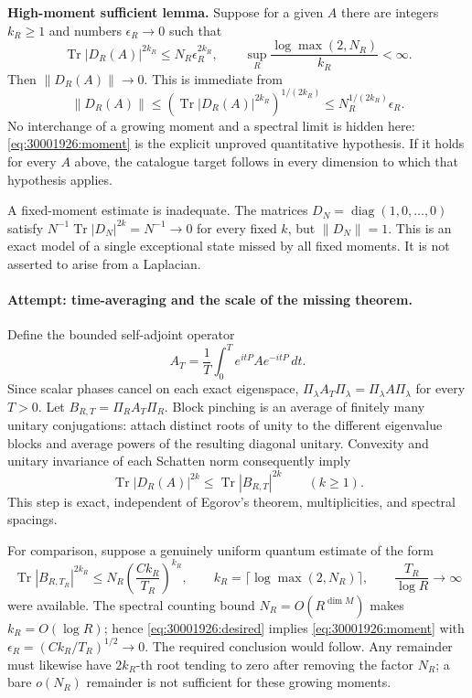 \documentclass[11pt,a4paper]{article}
\numberwithin{equation}{section}
\begin{document}
\textbf{High-moment sufficient lemma.}
Suppose for a given $A$ there are integers $k_R\geq1$ and numbers
$\epsilon_R\to0$ such that
\begin{equation}\label{eq:30001926:moment}
 \operatorname{Tr}|D_R(A)|^{2k_R}\leq N_R\epsilon_R^{2k_R},
 \qquad \sup_R\frac{\log\max(2,N_R)}{k_R}<\infty.
\end{equation}
Then $\|D_R(A)\|\to0$. This is immediate from
\[
 \|D_R(A)\|\leq
 (\operatorname{Tr}|D_R(A)|^{2k_R})^{1/(2k_R)}
 \leq N_R^{1/(2k_R)}\epsilon_R.
\]
No interchange of a growing moment and a spectral limit is hidden here:
\eqref{eq:30001926:moment} is the explicit unproved quantitative hypothesis.
If it holds for every $A$ above, the catalogue target follows in every
dimension to which that hypothesis applies.

A fixed-moment estimate is inadequate. The matrices
$D_N=\operatorname{diag}(1,0,\ldots,0)$ satisfy
$N^{-1}\operatorname{Tr}|D_N|^{2k}=N^{-1}\to0$ for every fixed $k$, but
$\|D_N\|=1$. This is an exact model of a single exceptional state missed
by all fixed moments. It is not asserted to arise from a Laplacian.

\paragraph{Attempt: time-averaging and the scale of the missing theorem.}
Define the bounded self-adjoint operator
\[
 A_T=\frac1T\int_0^T e^{itP}Ae^{-itP}\,dt.
\]
Since scalar phases cancel on each exact eigenspace,
$\Pi_\lambda A_T\Pi_\lambda=\Pi_\lambda A\Pi_\lambda$ for every $T>0$.
Let $B_{R,T}=\Pi_R A_T\Pi_R$. Block pinching is an average of finitely
many unitary conjugations: attach distinct roots of unity to the different
eigenvalue blocks and average powers of the resulting diagonal unitary.
Convexity and unitary invariance of each Schatten norm consequently imply
\begin{equation}\label{eq:30001926:pinching}
 \operatorname{Tr}|D_R(A)|^{2k}
 \leq\operatorname{Tr}|B_{R,T}|^{2k}\qquad(k\geq1).
\end{equation}
This step is exact, independent of Egorov's theorem, multiplicities, and
spectral spacings.

For comparison, suppose a genuinely uniform quantum estimate of the form
\begin{equation}\label{eq:30001926:desired}
 \operatorname{Tr}|B_{R,T_R}|^{2k_R}
 \leq N_R\left(\frac{Ck_R}{T_R}\right)^{k_R},\qquad
 k_R=\lceil\log\max(2,N_R)\rceil,
 \qquad \frac{T_R}{\log R}\longrightarrow\infty
\end{equation}
were available. The spectral counting bound $N_R=O(R^{\dim M})$ makes
$k_R=O(\log R)$; hence \eqref{eq:30001926:desired} implies
\eqref{eq:30001926:moment} with $\epsilon_R=(Ck_R/T_R)^{1/2}\to0$.
The required conclusion would follow. Any remainder must likewise have
$2k_R$-th root tending to zero after removing the factor $N_R$; a bare
$o(N_R)$ remainder is not sufficient for these growing moments.
\end{document}

